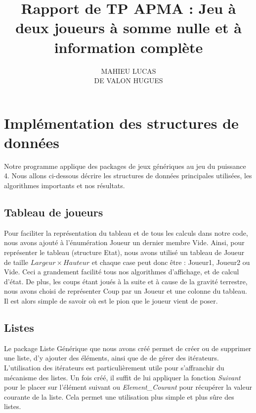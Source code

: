 \documentclass[a4paper, 10pt, french]{article}
\title {Rapport de TP APMA : Jeu à deux joueurs à somme nulle et à information complète}
\author
{
    MAHIEU LUCAS
    \\ DE VALON HUGUES
}
\begin{document}
\maketitle

\section{Implémentation des structures de données}
{

    Notre programme applique des packages de jeux génériques au jeu du puissance 4.
    Nous allons ci-dessous décrire les structures de données principales utilisées, les algorithmes importants et nos résultats.

    \subsection{Tableau de joueurs}
    {
        Pour faciliter la représentation du tableau et de tous les calculs dans notre code, nous avons ajouté à l'énumération
        Joueur un dernier membre Vide. Ainsi, pour représenter le tableau (structure Etat), nous avons utilisé un tableau 
        de Joueur de taille $Largeur  \times Hauteur$ et chaque case peut donc être : Joueur1, Joueur2 ou Vide. 
        Ceci a grandement facilité tous nos algorithmes d'affichage, et de calcul d'état. De plus, les coups étant joués à la suite
        et à cause de la gravité terrestre, nous avons choisi de représenter Coup par un Joueur et une colonne du tableau. Il est
        alors simple de savoir où est le pion que le joueur vient de poser.
    }

    \subsection{Listes}
    {
        Le package Liste Générique que nous avons créé permet de créer ou de supprimer une liste, d'y ajouter des éléments,
        ainsi que de de gérer des itérateurs. L'utilisation des itérateurs est particulièrement utile pour s'affranchir 
        du mécanisme des listes. Un fois créé, il suffit de lui appliquer la fonction {\em Suivant} pour le placer sur 
        l'élément suivant ou {\em Element\_Courant} pour récupérer la valeur courante de la liste. 
        Cela permet une utilisation plus simple et plus sûre des listes.
    }

}
\end{document}
